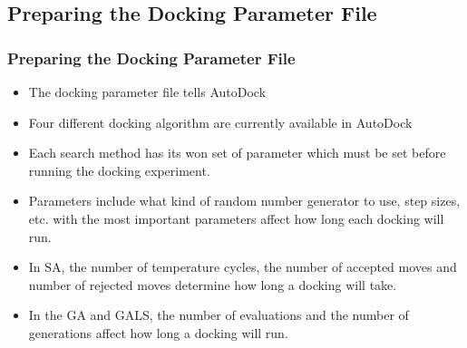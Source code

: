 \documentclass[slidestop,mathserif,compress,xcolor=svgnames]{beamer}
\begin{document}
\subsection{Preparing the Docking Parameter File}
\begin{frame}[allowframebreaks]
  \frametitle{\small Preparing the Docking Parameter File}
  \begin{block}{}
    \begin{itemize}
      \item The docking parameter file tells AutoDock
      \item Four different docking algorithm are currently available in AutoDock
      \item Each search method has its won set of parameter which must be set before running the docking experiment.
      \item Parameters include what kind of random number generator to use, step sizes, etc. with the most important parameters affect how long each docking will run.
      \item In SA, the number of temperature cycles, the number of accepted moves and number of rejected moves determine how long a docking will take.
      \item In the GA and GALS, the number of evaluations and the number of generations affect how long a docking will run.
    \end{itemize}
  \end{block}


\end{frame}
\end{document}
